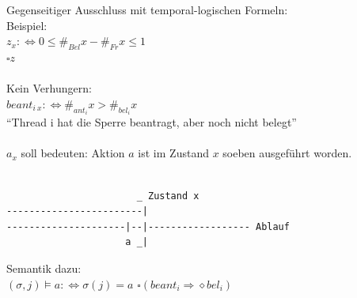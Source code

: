 Gegenseitiger Ausschluss mit temporal-logischen Formeln:\\
Beispiel:\\
$z_x :\Leftrightarrow 0 \leq \#_{Bel}x - \#_{Fr} x \leq 1$\\
$ \square z $\\
\\
Kein Verhungern:\\
$ beant_{i\ x} :\Leftrightarrow \#_{ant_i}x > \#_{bel_i}x $\\
"`Thread i hat die Sperre beantragt, aber noch nicht belegt"'\\
\\
$ a_x $ soll bedeuten: Aktion $ a $ ist im Zustand $ x $ soeben ausgeführt worden.

\begin{lstlisting}
                        
                       _ Zustand x
------------------------|
---------------------|--|------------------ Ablauf
                     a _|
\end{lstlisting}

Semantik dazu:\\
$(\sigma, j) \models a : \Leftrightarrow \sigma(j) = a$
$ \square (beant_i \Rightarrow \diamond bel_i) $

